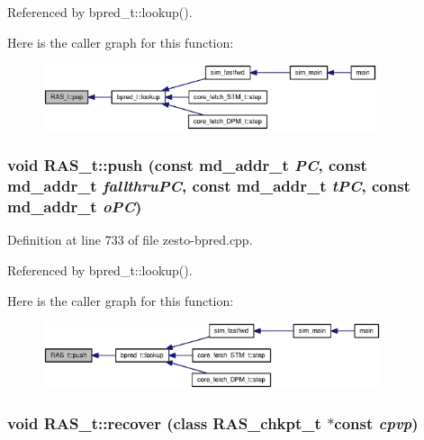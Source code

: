 Referenced by bpred\_\-t::lookup().

Here is the caller graph for this function:\nopagebreak
\begin{figure}[H]
\begin{center}
\leavevmode
\includegraphics[width=278pt]{classRAS__t_dae128acdfd775738dbe7e72590cff89_icgraph}
\end{center}
\end{figure}
\subsubsection[{push}]{\setlength{\rightskip}{0pt plus 5cm}void RAS\_\-t::push (const {\bf md\_\-addr\_\-t} {\em PC}, \/  const {\bf md\_\-addr\_\-t} {\em fallthruPC}, \/  const {\bf md\_\-addr\_\-t} {\em tPC}, \/  const {\bf md\_\-addr\_\-t} {\em oPC})\hspace{0.3cm}{\tt  [virtual]}}\label{classRAS__t_a1df3cc12d4def9b2242a5f52171d8c3}




Definition at line 733 of file zesto-bpred.cpp.

Referenced by bpred\_\-t::lookup().

Here is the caller graph for this function:\nopagebreak
\begin{figure}[H]
\begin{center}
\leavevmode
\includegraphics[width=281pt]{classRAS__t_a1df3cc12d4def9b2242a5f52171d8c3_icgraph}
\end{center}
\end{figure}
\subsubsection[{recover}]{\setlength{\rightskip}{0pt plus 5cm}void RAS\_\-t::recover (class {\bf RAS\_\-chkpt\_\-t} $\ast$const  {\em cpvp})\hspace{0.3cm}{\tt  [virtual]}}\label{classRAS__t_abae08514fc83550748c20d576670cf7}




